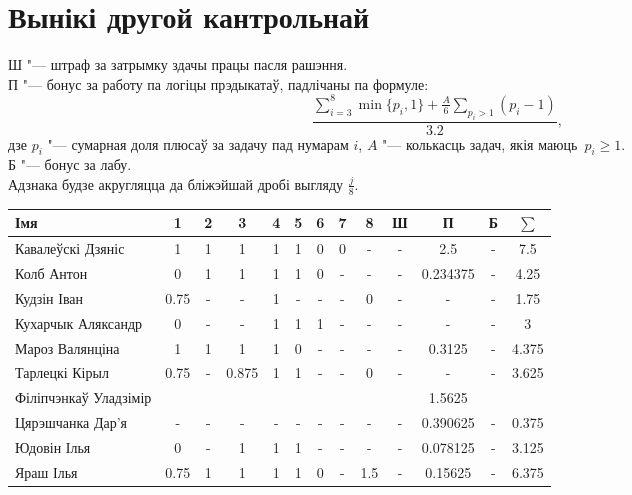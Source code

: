 

\geometry{left=1.5cm}


	\section{Вынікі другой кантрольнай}
	\noindent Ш "--- штраф за затрымку здачы працы пасля рашэння. \\
    П "--- бонус за работу па логіцы прэдыкатаў, падлічаны па формуле:
    $$\dfrac{\sum \limits _{i=3} ^8 \min\{p_i, 1\} + \frac{A}{6} \sum \limits _{p_i > 1} (p_i - 1)}{3.2},$$
    дзе $p_i$ "--- сумарная доля плюсаў за задачу пад нумарам $i$, $A$ "--- колькасць задач, якія маюць~$p_i \geqslant 1$. \\
    Б "--- бонус за лабу. \\
    Адзнака будзе акругляцца да бліжэйшай дробі выгляду $\frac{j}{8}$.
\begin{table}[H]
	\begin{tabular}{|l|c|c|c|c|c|c|c|c|c|c|c|c|}
		\hline
		Імя                   &  1   &  2   &   3   & 4 & 5 &  6   &  7   &   8   & Ш &   П    &   Б   & $\sum$ \\ \hline
		Кавалеўскі Дзяніс     & 1    &  1   & 1 & 1 & 1 & 0    & 0  &  -    & - & 2.5 & - &   7.5  \\ \hline
		Колб Антон            &  0   & 1    & 1 & 1 & 1 &  0   & - & -     & - & 0.234375 &  -    & 4.25  \\ \hline
		Кудзін Іван           &   0.75  & -    & -  & 1 & - & -    & -    & 0     & -  &  -  &  -    & 1.75  \\ \hline
		Кухарчык Аляксандр    & 0 &  -   & - & 1 & 1 &  1   &  -   &  -    & - &   -    & -  & 3  \\ \hline
		Мароз Валянціна       &  1   &  1   &   1   & 1 & 0 &  -   &  -   &  -  & - & 0.3125      &   -   &   4.375    \\ \hline
		Тарлецкі Кірыл        & 0.75    & -    & 0.875     & 1 & 1 & -    & -    & 0     & - & - &  -    &   3.625    \\ \hline
		Філіпчэнкаў Уладзімір &     &     &      &  &  &     &     &      &  & 1.5625 &      &      \\ \hline
		Цярэшчанка Дар'я      &  -   & - & - & - & - & -    & - &  -    & - & 0.390625   &  -    & 0.375  \\ \hline
		Юдовін Ілья           &  0   &  -   & 1 & 1 & 1 & -    & -  &  -    & -  &  0.078125     &  -    &  3.125 \\ \hline
		Яраш Ілья             &  0.75   &  1   & 1 & 1 & 1 & 0 & - & 1.5 & - &  0.15625  &  -    &  6.375  \\ \hline
	\end{tabular}
\end{table}


